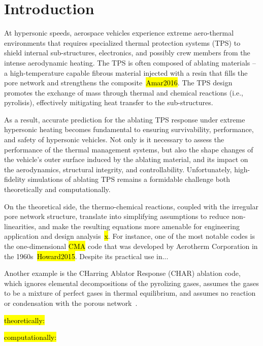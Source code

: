 \section{Introduction}

At hypersonic speeds, aerospace vehicles experience extreme aero-thermal environments that requires specialized thermal protection systems (TPS) to shield internal sub-structures, electronics, and possibly crew members from the intense aerodynamic heating. The TPS is often composed of ablating materials -- a high-temperature capable fibrous material injected with a resin that fills the pore network and strengthens the composite~\hl{Amar2016}. The TPS design promotes the exchange of mass through thermal and chemical reactions (i.e., pyrolisis), effectively mitigating heat transfer to the sub-structures.

As a result, accurate prediction for the ablating TPS response under extreme hypersonic heating becomes fundamental to ensuring survivability, performance, and safety of hypersonic vehicles. Not only is it necessary to assess the performance of the thermal management systems, but also the shape changes of the vehicle's outer surface induced by the ablating material, and its impact on the aerodynamics, structural integrity, and controllability. Unfortunately, high-fidelity simulations of ablating TPS remains a formidable challenge both theoretically and computationally.

On the theoretical side, the thermo-chemical reactions, coupled with the irregular pore network structure, translate into simplifying assumptions to reduce non-linearities, and make the resulting equations more amenable for engineering application and design analysis~\hl{x}. For instance, one of the most notable codes is the one-dimensional \hl{CMA} code that was developed by Aerotherm Corporation in the 1960s~\hl{Howard2015}. Despite its practical use in...

Another example is the CHarring Ablator Response (CHAR) ablation code, which ignores elemental decompositions of the pyrolizing gases, assumes the gases to be a mixture of perfect gases in thermal equilibrium, and assumes no reaction or condensation with the porous network~\cite{Amar2016}.



\hl{theoretically:}

\hl{computationally:}
